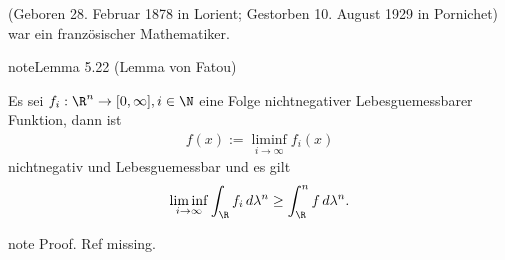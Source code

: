 \documentclass[letterpaper,10pt,german]{jupyterBook}
\begin{document}
\begin{sphinxShadowBox}

\sphinxAtStartPar
{} (Geboren 28. Februar 1878 in Lorient; Gestorben 10. August 1929 in Pornichet) war ein französischer Mathematiker.
\end{sphinxShadowBox}
\label{masstheorie/lebesgue_integral:lemma-15}
\begin{sphinxadmonition}{note}{Lemma 5.22 (Lemma von Fatou)}



\sphinxAtStartPar
Es sei \(f_i:\R^n\to[0,\infty],i\in\N\) eine Folge nicht\sphinxhyphen{}negativer Lebesgue\sphinxhyphen{}messbarer Funktion, dann ist
\begin{equation*}
\begin{split}f(x) := \liminf_{i\to\infty} f_i(x)\end{split}
\end{equation*}
\sphinxAtStartPar
nicht\sphinxhyphen{}negativ und Lebesgue\sphinxhyphen{}messbar und es gilt
\begin{equation*}
\begin{split}\liminf_{i\to\infty} \int_{\R} f_i\, d\lambda^n \geq \int_\R^n f\, d\lambda^n.\end{split}
\end{equation*}\end{sphinxadmonition}

\begin{sphinxadmonition}{note}
\sphinxAtStartPar
Proof. Ref missing.
\end{sphinxadmonition}
\end{document}
